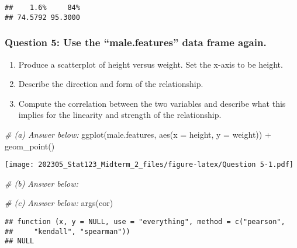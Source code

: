 \documentclass[
]{article}
\newenvironment{Shaded}{\begin{snugshade}}{\end{snugshade}}
\newcommand{\AttributeTok}[1]{\textcolor[rgb]{0.77,0.63,0.00}{#1}}
\newcommand{\CommentTok}[1]{\textcolor[rgb]{0.56,0.35,0.01}{\textit{#1}}}
\newcommand{\FunctionTok}[1]{\textcolor[rgb]{0.00,0.00,0.00}{#1}}
\newcommand{\NormalTok}[1]{#1}
\newcommand{\SpecialCharTok}[1]{\textcolor[rgb]{0.00,0.00,0.00}{#1}}
\begin{document}
\begin{verbatim}
##    1.6%     84% 
## 74.5792 95.3000
\end{verbatim}

\hypertarget{question-5-use-the-male.features-data-frame-again.}{%
\subsubsection{Question 5: Use the ``male.features'' data frame
again.}\label{question-5-use-the-male.features-data-frame-again.}}

\begin{enumerate}
\def\labelenumi{(\alph{enumi})}
\item
  Produce a scatterplot of height versus weight. Set the x-axis to be
  height.
\item
  Describe the direction and form of the relationship.
\item
  Compute the correlation between the two variables and describe what
  this implies for the linearity and strength of the relationship.
\end{enumerate}

\begin{Shaded}
\begin{Highlighting}[]
\CommentTok{\# (a) Answer below:}
\FunctionTok{ggplot}\NormalTok{(male.features, }\FunctionTok{aes}\NormalTok{(}\AttributeTok{x =}\NormalTok{ height, }\AttributeTok{y =}\NormalTok{ weight)) }\SpecialCharTok{+} 
  \FunctionTok{geom\_point}\NormalTok{()}
\end{Highlighting}
\end{Shaded}

\texttt{[image: 202305\_Stat123\_Midterm\_2\_files/figure-latex/Question 5-1.pdf]}

\begin{Shaded}
\begin{Highlighting}[]
\CommentTok{\# (b) Answer below:}


\CommentTok{\# (c) Answer below:}
\FunctionTok{args}\NormalTok{(cor)}
\end{Highlighting}
\end{Shaded}

\begin{verbatim}
## function (x, y = NULL, use = "everything", method = c("pearson", 
##     "kendall", "spearman")) 
## NULL
\end{verbatim}

\begin{Shaded}
\end{Shaded}
\end{document}
